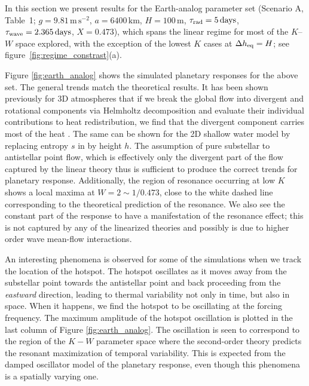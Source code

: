 \documentclass[trackchanges,twocolumn]{aastex7}
\begin{document}
In this section we present results for the Earth-analog parameter set (Scenario A, Table~1; $g=9.81\,\mathrm{m\,s^{-2}}$, $a=6400\,\mathrm{km}$, $H=100\,\mathrm{m}$, $\tau_{\rm rad}=5\,\mathrm{days}$, $\tau_{\rm wave}=2.365\,\mathrm{days}$, $X=0.473$), which spans the linear regime for most of the $K$--$W$ space explored, with the exception of the lowest $K$ cases at $\Delta h_{\rm eq} = H$; see figure~\ref{fig:regime_constrast}(a). 

Figure \ref{fig:earth_analog} shows the simulated planetary responses for the above set. The general trends match the theoretical results. It has been shown previously for 3D atmospheres that if we break the global flow into divergent and rotational components via Helmholtz decomposition and evaluate their individual contributions to heat redistribution, we find that the divergent component carries most of the heat \cite{hammond2021rotational}. The same can be shown for the 2D shallow water model by replacing entropy $s$ in \cite{hammond2021rotational} by height $h$. The assumption of pure substellar to antistellar point flow, which is effectively only the divergent part of the flow captured by the linear theory thus is sufficient to produce the correct trends for planetary response. Additionally, the region of resonance occurring at low $K$ shows a local maxima at $W=2\sim1/0.473$, close to the white dashed line corresponding to the theoretical prediction of the resonance. We also see the constant part of the response to have a manifestation of the resonance effect; {\color{blue} this is not captured by any of the linearized theories and possibly is due to higher order wave mean-flow interactions}. 

An interesting phenomena is observed for some of the simulations when we track the location of the hotspot. The hotspot oscillates as it moves away from the substellar point towards the antistellar point and back proceeding from the \textit{eastward} direction, leading to thermal variability not only in time, but also in space. When it happens, we find the hotspot to be oscillating at the forcing frequency. The maximum amplitude of the hotspot oscillation is plotted in the last column of Figure \ref{fig:earth_analog}. The oscillation is seen to correspond to the region of the $K-W$ parameter space where the second-order theory predicts the resonant maximization of temporal variability. This is expected from the damped oscillator model of the planetary response, even though this phenomena is a spatially varying one.
\end{document}
